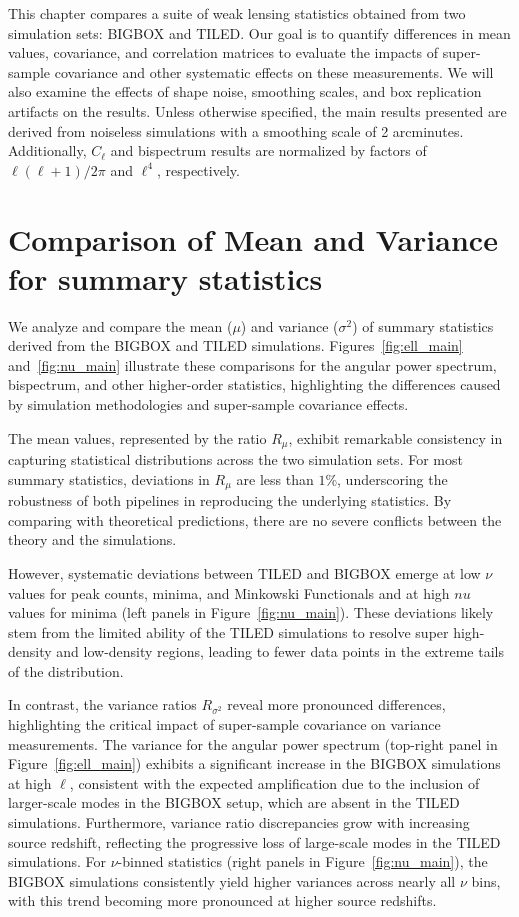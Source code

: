 This chapter compares a suite of weak lensing statistics obtained from two simulation sets: BIGBOX and TILED. Our goal is to quantify differences in mean values, covariance, and correlation matrices to evaluate the impacts of super-sample covariance and other systematic effects on these measurements. We will also examine the effects of shape noise, smoothing scales, and box replication artifacts on the results. Unless otherwise specified, the main results presented are derived from noiseless simulations with a smoothing scale of 2 arcminutes. Additionally, $C_\ell$ and bispectrum results are normalized by factors of $\ell(\ell+1)/2\pi$ and $\ell^4$, respectively.

\section{Comparison of Mean and Variance for summary statistics}
We analyze and compare the mean ($\mu$) and variance ($\sigma^2$) of summary statistics derived from the BIGBOX and TILED simulations. Figures~\ref{fig:ell_main} and~\ref{fig:nu_main} illustrate these comparisons for the angular power spectrum, bispectrum, and other higher-order statistics, highlighting the differences caused by simulation methodologies and super-sample covariance effects.

The mean values, represented by the ratio $R_{\mu}$, exhibit remarkable consistency in capturing statistical distributions across the two simulation sets. For most summary statistics, deviations in $R_{\mu}$ are less than $1\%$, underscoring the robustness of both pipelines in reproducing the underlying statistics. By comparing with theoretical predictions, there are no severe conflicts between the theory and the simulations.

However, systematic deviations between TILED and BIGBOX emerge at low $\nu$ values for peak counts, minima, and Minkowski Functionals and at high $nu$ values for minima (left panels in Figure~\ref{fig:nu_main}). These deviations likely stem from the limited ability of the TILED simulations to resolve super high-density and low-density regions, leading to fewer data points in the extreme tails of the distribution.

In contrast, the variance ratios $R_{\sigma^2}$ reveal more pronounced differences, highlighting the critical impact of super-sample covariance on variance measurements. The variance for the angular power spectrum (top-right panel in Figure~\ref{fig:ell_main}) exhibits a significant increase in the BIGBOX simulations at high $\ell$, consistent with the expected amplification due to the inclusion of larger-scale modes in the BIGBOX setup, which are absent in the TILED simulations. Furthermore, variance ratio discrepancies grow with increasing source redshift, reflecting the progressive loss of large-scale modes in the TILED simulations. For $\nu$-binned statistics (right panels in Figure~\ref{fig:nu_main}), the BIGBOX simulations consistently yield higher variances across nearly all $\nu$ bins, with this trend becoming more pronounced at higher source redshifts. %

